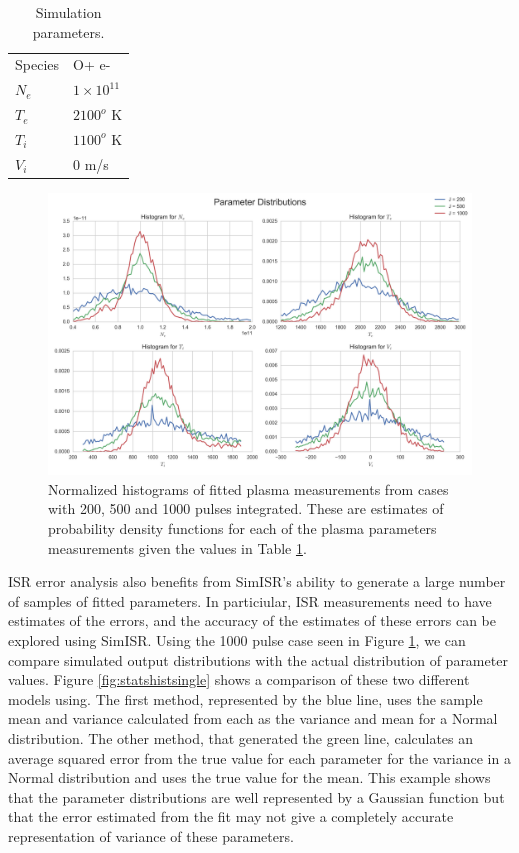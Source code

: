 \documentclass[draft,ras]{agutex}
\begin{document}
\begin{article}
\begin{table}[!t]
\centering
\caption{Simulation parameters.}
\label{tb:param1}
\begin{tabular}{ll}
Species & O+ e-\\
$N_e$    & $1\times 10^{11}$ \\
$T_e$      & $2100^o$ K   \\
$T_i$      & $1100^o$ K \\
$V_i$      & $0$ m/s
\end{tabular}
\end{table}

\begin{figure}[!t]
\centering
\includegraphics[width=5in]{datahist}
\caption{Normalized histograms of fitted plasma measurements from cases with 200, 500 and 1000 pulses integrated. These are estimates of probability density functions for each of the plasma parameters measurements given the values in Table \ref{tb:param1}.}
\label{fig:statshistall}
\end{figure}

ISR error analysis also benefits from SimISR's ability to generate a large number of samples of fitted parameters. In particiular, ISR measurements need to have estimates of the errors, and the accuracy of the estimates of these errors can be explored using SimISR. Using the 1000 pulse case seen in Figure \ref{fig:statshistall}, we can compare simulated output distributions with the actual distribution of parameter values. Figure \ref{fig:statshistsingle} shows a comparison of these two different models using. The first method, represented by the blue line, uses the sample mean and variance calculated from each as the variance and mean for a Normal distribution. The other method, that generated the green line, calculates an average squared error from the true value for each parameter for the variance in a Normal distribution and uses the true value for the mean. 
This example shows that the parameter distributions are well represented by a Gaussian function but that the error estimated from the fit may not give a completely accurate representation of variance of these parameters. 


\end{article}
\end{document}
